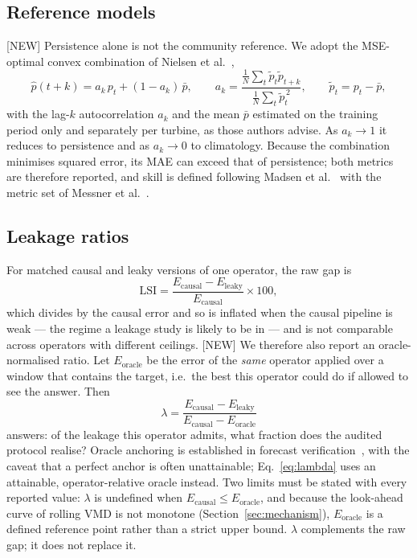 \documentclass[review,3p,times]{elsarticle}
\begin{document}
\subsection{Reference models}\label{sec:reference}
\textsf{[NEW]} Persistence alone is not the community reference. We adopt the
MSE-optimal convex combination of Nielsen et al.~\cite{nielsen1998},
\begin{equation}
\hat p(t+k) = a_k\,p_t + (1-a_k)\,\bar p,
\qquad
a_k = \frac{\frac{1}{N}\sum_t \tilde p_t \tilde p_{t+k}}
            {\frac{1}{N}\sum_t \tilde p_t^{\,2}},
\qquad \tilde p_t = p_t-\bar p,
\label{eq:nielsen}
\end{equation}
with the lag-$k$ autocorrelation $a_k$ and the mean $\bar p$ estimated on the
training period only and separately per turbine, as those authors advise.
As $a_k\to1$ it reduces to persistence and as $a_k\to0$ to climatology.
Because the combination minimises squared error, its MAE can exceed that of
persistence; both metrics are therefore reported, and skill is defined
following Madsen et al.~\cite{madsen2005} with the metric set of
Messner et al.~\cite{messner2020}.

\subsection{Leakage ratios}\label{sec:lambda}
For matched causal and leaky versions of one operator, the raw gap is
\begin{equation}
\mathrm{LSI} =
\frac{E_{\mathrm{causal}}-E_{\mathrm{leaky}}}{E_{\mathrm{causal}}}\times 100 ,
\label{eq:lsi}
\end{equation}
which divides by the causal error and so is inflated when the causal pipeline
is weak --- the regime a leakage study is likely to be in --- and is not
comparable across operators with different ceilings.
\textsf{[NEW]} We therefore also report an oracle-normalised ratio. Let
$E_{\mathrm{oracle}}$ be the error of the \emph{same} operator applied over a
window that contains the target, i.e.\ the best this operator could do if
allowed to see the answer. Then
\begin{equation}
\lambda =
\frac{E_{\mathrm{causal}}-E_{\mathrm{leaky}}}
     {E_{\mathrm{causal}}-E_{\mathrm{oracle}}}
\label{eq:lambda}
\end{equation}
answers: of the leakage this operator admits, what fraction does the audited
protocol realise? Oracle anchoring is established in forecast
verification~\cite{wheatcroft2019}, with the caveat that a perfect anchor is
often unattainable; Eq.~\eqref{eq:lambda} uses an attainable,
operator-relative oracle instead. Two limits must be stated with every
reported value: $\lambda$ is undefined when
$E_{\mathrm{causal}}\le E_{\mathrm{oracle}}$, and because the look-ahead curve
of rolling VMD is not monotone (Section~\ref{sec:mechanism}),
$E_{\mathrm{oracle}}$ is a defined reference point rather than a strict upper
bound. $\lambda$ complements the raw gap; it does not replace it.
\end{document}
